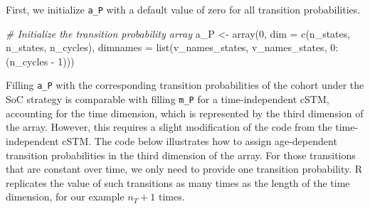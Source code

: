 \documentclass[
]{article}
\newenvironment{Shaded}{\begin{snugshade}}{\end{snugshade}}
\newcommand{\AttributeTok}[1]{\textcolor[rgb]{0.77,0.63,0.00}{#1}}
\newcommand{\CommentTok}[1]{\textcolor[rgb]{0.56,0.35,0.01}{\textit{#1}}}
\newcommand{\DecValTok}[1]{\textcolor[rgb]{0.00,0.00,0.81}{#1}}
\newcommand{\FunctionTok}[1]{\textcolor[rgb]{0.00,0.00,0.00}{#1}}
\newcommand{\NormalTok}[1]{#1}
\newcommand{\OtherTok}[1]{\textcolor[rgb]{0.56,0.35,0.01}{#1}}
\newcommand{\SpecialCharTok}[1]{\textcolor[rgb]{0.00,0.00,0.00}{#1}}
\begin{document}
First, we initialize \texttt{a\_P} with a default value of zero for all transition probabilities.

\begin{Shaded}
\begin{Highlighting}[]
\CommentTok{\# Initialize the transition probability array}
\NormalTok{a\_P }\OtherTok{\textless{}{-}} \FunctionTok{array}\NormalTok{(}\DecValTok{0}\NormalTok{, }\AttributeTok{dim =} \FunctionTok{c}\NormalTok{(n\_states, n\_states, n\_cycles),}
              \AttributeTok{dimnames =} \FunctionTok{list}\NormalTok{(v\_names\_states, v\_names\_states, }\DecValTok{0}\SpecialCharTok{:}\NormalTok{(n\_cycles }\SpecialCharTok{{-}} \DecValTok{1}\NormalTok{)))}
\end{Highlighting}
\end{Shaded}

Filling \texttt{a\_P} with the corresponding transition probabilities of the cohort under the SoC strategy is comparable with filling \texttt{m\_P} for a time-independent cSTM, accounting for the time dimension, which is represented by the third dimension of the array. However, this requires a slight modification of the code from the time-independent cSTM. The code below illustrates how to assign age-dependent transition probabilities in the third dimension of the array. For those transitions that are constant over time, we only need to provide one transition probability. R replicates the value of such transitions as many times as the length of the time dimension, for our example \(n_T+1\) times.
\end{document}
